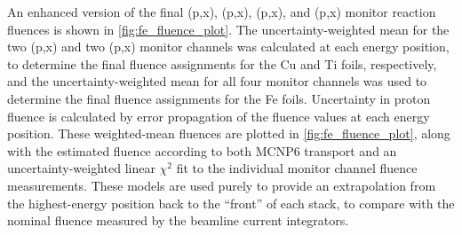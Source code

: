 An enhanced version of the final (p,x), (p,x), (p,x), and (p,x) monitor reaction fluences is shown in \autoref{fig:fe_fluence_plot}.
The uncertainty-weighted mean  for the two (p,x) and two (p,x) monitor channels was calculated at each energy position, to determine the final fluence assignments for the Cu and Ti foils, respectively, and the uncertainty-weighted mean  for all four monitor channels was used to determine the final fluence assignments for the Fe foils.
Uncertainty in proton fluence  is  calculated by error propagation of the fluence values  at each energy position.
These weighted-mean fluences are  plotted  in \autoref{fig:fe_fluence_plot}, along with the estimated fluence according to both  MCNP6 transport 
and an uncertainty-weighted linear $\chi^2$ fit to the individual monitor channel fluence measurements.
These models are used purely to provide an extrapolation from the highest-energy position back to the \enquote{front} of each stack, to compare with the nominal fluence measured by  the beamline current integrators.



